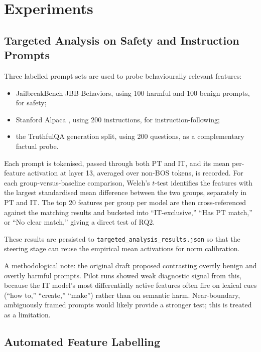 \pagestyle{fancy}

\section{Experiments}

\subsection{Targeted Analysis on Safety and Instruction Prompts}
\label{subsec:targeted-analysis}

Three labelled prompt sets are used to probe behaviourally relevant features:
\begin{itemize}
    \item JailbreakBench JBB-Behaviors, using 100 harmful and 100 benign prompts, for safety;
    \item Stanford Alpaca \parencite{taori_stanford_alpaca_2023}, using 200 instructions, for instruction-following;
    \item the TruthfulQA generation split, using 200 questions, as a complementary factual probe.
\end{itemize}

Each prompt is tokenised, passed through both PT and IT, and its mean per-feature activation at layer 13, averaged over non-BOS tokens, is recorded. For each group-versus-baseline comparison, Welch's $t$-test identifies the features with the largest standardised mean difference between the two groups, separately in PT and IT. The top 20 features per group per model are then cross-referenced against the matching results and bucketed into ``IT-exclusive,'' ``Has PT match,'' or ``No clear match,'' giving a direct test of RQ2.

These results are persisted to \texttt{targeted\_analysis\_results.json} so that the steering stage can reuse the empirical mean activations for norm calibration.

A methodological note: the original draft proposed contrasting overtly benign and overtly harmful prompts. Pilot runs showed weak diagnostic signal from this, because the IT model's most differentially active features often fire on lexical cues (``how to,'' ``create,'' ``make'') rather than on semantic harm. Near-boundary, ambiguously framed prompts would likely provide a stronger test; this is treated as a limitation.

\subsection{Automated Feature Labelling}
\label{subsec:feature-labelling}

